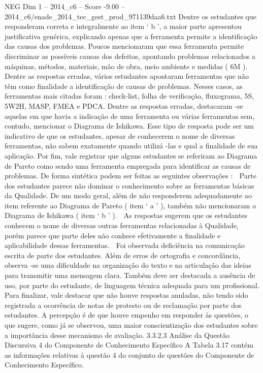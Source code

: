 \begin{textsample}{NEG Dim 1 – 2014\_c6 – Score -9.00 – 2014\_c6/enade\_2014\_tec\_gest\_prod\_971139daa6.txt}
Dentre os estudantes que responderam correta e integralmente ao item ‘ b ’, a maior parte apresentou justificativa genérica, explicando apenas que a ferramenta permite a identificação das causas dos problemas.
Poucos mencionaram que essa ferramenta permite discriminar as possíveis causas dos defeitos, apontando problemas relacionados a máquinas, métodos, materiais, mão de obra, meio ambiente e medidas ( 6M ).
Dentre as respostas erradas, vários estudantes apontaram ferramentas que não têm como finalidade a identificação de causas de problemas.
Nesses casos, as ferramentas mais citadas foram : check-list, folha de verificação, fluxograma, 5S, 5W2H, MASP, FMEA e PDCA.
Dentre as respostas erradas, destacaram -se aquelas em que havia a indicação de uma ferramenta ou várias ferramentas sem, contudo, mencionar o Diagrama de Ishikawa.
Esse tipo de resposta pode ser um indicativo de que os estudantes, apesar de conhecerem o nome de diversas ferramentas, não sabem exatamente quando utilizá -las e qual a finalidade de sua aplicação.
Por fim, vale registrar que alguns estudantes se referiram ao Diagrama de Pareto como sendo uma ferramenta empregada para identificar as causas de problemas.
De forma sintética podem ser feitas as seguintes observações :  Parte dos estudantes parece não dominar o conhecimento sobre as ferramentas básicas da Qualidade.
De um modo geral, além de não responderem adequadamente ao item referente ao Diagrama de Pareto ( item ‘ a ’ ), também não mencionaram o Diagrama de Ishikawa ( item ‘ b ’ ).  As respostas sugerem que os estudantes conhecem o nome de diversas outras ferramentas relacionadas à Qualidade, porém parece que parte deles não conhece efetivamente a finalidade e aplicabilidade dessas ferramentas.  Foi observada deficiência na comunicação escrita de parte dos estudantes.
Além de erros de ortografia e concordância, observa -se uma dificuldade na organização do texto e na articulação das ideias para transmitir uma mensagem clara.
Também deve ser destacada a ausência de uso, por parte do estudante, de linguagem técnica adequada para um profissional.
Para finalizar, vale destacar que não houve respostas anuladas, não tendo sido registrada a ocorrência de notas de protesto ou de reclamação por parte dos estudantes.
A percepção é de que houve empenho em responder às questões, o que sugere, como já se observou, uma maior conscientização dos estudantes sobre a importância desse mecanismo de avaliação. 3.3.2.3 Análise da Questão Discursiva 4 do Componente de Conhecimento Específico A Tabela 3.17 contém as informações relativas à questão 4 do conjunto de questões do Componente de Conhecimento Específico.

\end{textsample}
